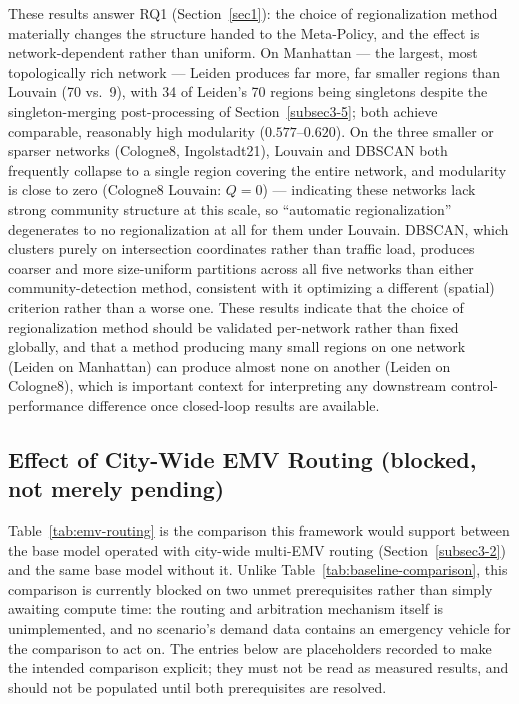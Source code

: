 \documentclass[3p,times]{elsarticle}
\theoremstyle{plain}
\theoremstyle{definition}
\begin{document}
These results answer RQ1 (Section~\ref{sec1}): the choice of
regionalization method materially changes the structure handed to the
Meta-Policy, and the effect is network-dependent rather than uniform.
On Manhattan --- the largest, most topologically rich network ---
Leiden produces far more, far smaller regions than Louvain (70 vs.\ 9),
with 34 of Leiden's 70 regions being singletons despite the
singleton-merging post-processing of Section~\ref{subsec3-5}; both
achieve comparable, reasonably high modularity ($0.577$--$0.620$). On
the three smaller or sparser networks (Cologne8, Ingolstadt21), Louvain
and DBSCAN both frequently collapse to a single region covering the
entire network, and modularity is close to zero (Cologne8 Louvain:
$Q{=}0$) --- indicating these networks lack strong community structure
at this scale, so ``automatic regionalization'' degenerates to no
regionalization at all for them under Louvain. DBSCAN, which clusters
purely on intersection coordinates rather than traffic load, produces
coarser and more size-uniform partitions across all five networks
than either community-detection method, consistent with it optimizing
a different (spatial) criterion rather than a worse one. These results
indicate that the choice of regionalization method should be
validated per-network rather than fixed globally, and that a method
producing many small regions on one network (Leiden on Manhattan) can
produce almost none on another (Leiden on Cologne8), which is
important context for interpreting any downstream control-performance
difference once closed-loop results are available.

\subsection{Effect of City-Wide EMV Routing (blocked, not merely pending)}\label{subsec6-1}

Table~\ref{tab:emv-routing} is the comparison this framework would
support between the base model operated with city-wide multi-EMV
routing (Section~\ref{subsec3-2}) and the same base model without it.
Unlike Table~\ref{tab:baseline-comparison}, this comparison is
currently blocked on two unmet prerequisites rather than simply awaiting
compute time: the routing and arbitration mechanism itself is
unimplemented, and no scenario's demand data contains an emergency
vehicle for the comparison to act on. The entries below are
placeholders recorded to make the intended comparison explicit; they
must not be read as measured results, and should not be populated until
both prerequisites are resolved.
\end{document}
